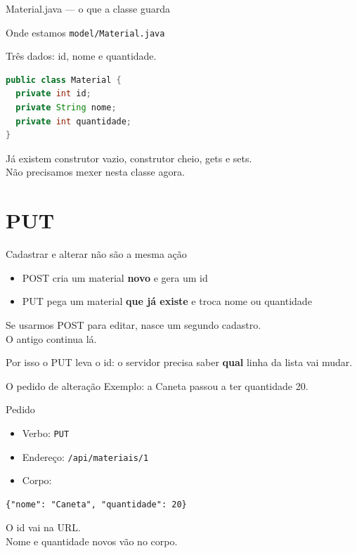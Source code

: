 \documentclass[aspectratio=169,11pt]{beamer}
\newcommand{\onde}[1]{%
  \begin{block}{Onde estamos}
    #1
  \end{block}
}
\begin{document}
\begin{frame}[fragile]{Material.java --- o que a classe guarda}
  \onde{\texttt{model/Material.java}}

  Três dados: id, nome e quantidade.

\begin{lstlisting}[language=Java,basicstyle=\ttfamily\footnotesize]
public class Material {
  private int id;
  private String nome;
  private int quantidade;
}
\end{lstlisting}

  Já existem construtor vazio, construtor cheio, gets e sets.\\
  Não precisamos mexer nesta classe agora.
\end{frame}

\section{PUT}

\begin{frame}{Cadastrar e alterar não são a mesma ação}
  \begin{itemize}
    \item POST cria um material \textbf{novo} e gera um id
    \item PUT pega um material \textbf{que já existe} e troca
          nome ou quantidade
  \end{itemize}

  \vspace{0.6em}
  Se usarmos POST para editar, nasce um segundo cadastro.\\
  O antigo continua lá.

  \vspace{0.5em}
  Por isso o PUT leva o id: o servidor precisa saber
  \textbf{qual} linha da lista vai mudar.
\end{frame}

\begin{frame}[fragile]{O pedido de alteração}
  Exemplo: a Caneta passou a ter quantidade 20.

  \vspace{0.4em}
  \begin{block}{Pedido}
    \begin{itemize}
      \item Verbo: \texttt{PUT}
      \item Endereço: \texttt{/api/materiais/1}
      \item Corpo:
    \end{itemize}
\begin{lstlisting}[basicstyle=\ttfamily\footnotesize]
{"nome": "Caneta", "quantidade": 20}
\end{lstlisting}
  \end{block}

  \vspace{0.2em}
  O id vai na URL.\\
  Nome e quantidade novos vão no corpo.
\end{frame}
\end{document}
